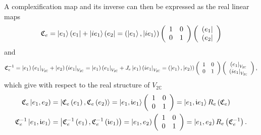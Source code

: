 \documentclass[aps,preprint]{revtex4}%
\begin{document}
A complexification map and its inverse can then be expressed as the real
linear maps
\begin{equation}
\mathfrak{C}_{e}=\left\vert e_{1}\right\rangle \left(  e_{1}\right\vert
+\left\vert ie_{1}\right\rangle \left(  e_{2}\right\vert =\left(  \left\vert
e_{1}\right\rangle ,\left\vert ie_{1}\right\rangle \right)  \left(
\begin{array}
[c]{cc}%
1 & 0\\
0 & 1
\end{array}
\right)  \left(
\begin{array}
[c]{c}%
\left(  e_{1}\right\vert \\
\left(  e_{2}\right\vert
\end{array}
\right)
\end{equation}
and%
\begin{equation}
\mathfrak{C}_{e}^{-1}=\left\vert e_{1}\right)  \left(  e_{1}\right\vert
_{V_{2\mathbb{C}}}+\left\vert e_{2}\right)  \left(  ie_{1}\right\vert
_{V_{2\mathbb{C}}}=\left\vert e_{1}\right)  \left(  e_{1}\right\vert
_{V_{2\mathbb{C}}}+J_{e}\left\vert e_{1}\right)  \left(  ie_{1}\right\vert
_{V_{2\mathbb{C}}}=\left(  \left\vert e_{1}\right)  ,\left\vert e_{2}\right)
\right)  \left(
\begin{array}
[c]{cc}%
1 & 0\\
0 & 1
\end{array}
\right)  \left(
\begin{array}
[c]{c}%
\left(  e_{1}\right\vert _{V_{2\mathbb{C}}}\\
\left(  ie_{1}\right\vert _{V_{2\mathbb{C}}}%
\end{array}
\right)  ,
\end{equation}
which give with respect to the real structure of $V_{2\mathbb{C}}$
\begin{align}
\mathfrak{C}_{e}\left\vert e_{1},e_{2}\right)   &  =\left\vert \mathfrak{C}%
_{e}\left(  e_{1}\right)  ,\mathfrak{C}_{e}\left(  e_{2}\right)  \right\rangle
=\left\vert e_{1},\mathfrak{i}e_{1}\right\rangle \left(
\begin{array}
[c]{cc}%
1 & 0\\
0 & 1
\end{array}
\right)  =\left\vert e_{1},\mathfrak{i}e_{1}\right\rangle R_{e}\left(
\mathfrak{C}_{e}\right) \\
\mathfrak{C}_{e}^{-1}\left\vert e_{1},\mathfrak{i}e_{1}\right\rangle  &
=\left\vert \mathfrak{C}_{e}^{-1}\left(  e_{1}\right)  ,\mathfrak{C}_{e}%
^{-1}\left(  \mathfrak{i}e_{1}\right)  \right)  =\left\vert e_{1}%
,e_{2}\right)  \left(
\begin{array}
[c]{cc}%
1 & 0\\
0 & 1
\end{array}
\right)  =\left\vert e_{1},e_{2}\right)  R_{e}\left(  \mathfrak{C}_{e}%
^{-1}\right)  .
\end{align}
\end{document}

